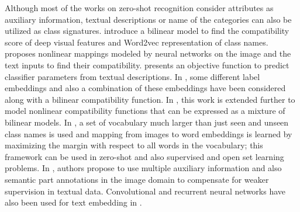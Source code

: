 \documentclass[10pt,twocolumn,letterpaper]{article}
\begin{document}
 Although most of the works on zero-shot recognition consider attributes as auxiliary information,
textual descriptions or name of the categories can also be utilized as class signatures.
 \cite{devise} introduce a bilinear model to find the compatibility score of deep visual features and Word2vec \cite{word2vec} representation of class names.
\cite{ba2015} proposes nonlinear mappings modeled by neural networks on the image and the text inputs to find their compatibility.
\cite{mohamed13} presents an objective function to predict classifier parameters from textual descriptions.
 In \cite{Akata2015}, some different label embeddings and also a combination of these embeddings have been considered along with a bilinear
 compatibility function.
  In \cite{Xian2016}, this work is extended further to model nonlinear compatibility
 functions that can be expressed as a mixture of bilinear models.
In \cite{Fu2016}, a set of vocabulary much larger than just seen and unseen class names is used and mapping from images to word embeddings is learned
by  maximizing the margin with respect to all words in the vocabulary;
 this framework can be used in zero-shot and also supervised and open set learning problems.
In  \cite{Akata2016}, authors propose to use multiple auxiliary information and also
 semantic part annotations in the image domain to compensate for weaker supervision in textual data.
Convolutional and recurrent neural networks have also been used for text embedding in \cite{Akata2016rnn}.
\end{document}
